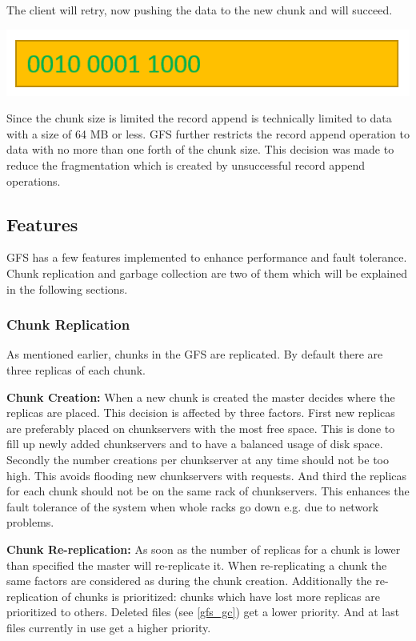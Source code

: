 \documentclass{sig-alternate}
\begin{document}
The client will retry, now pushing the data to the new chunk and will succeed.

\includegraphics[width=\linewidth]{gfs_pics/writeappend_3.png}

Since the chunk size is limited the record append is technically limited to data with a size of 64 MB or less. GFS further restricts the record append operation to data with no more than one forth of the chunk size. This decision was made to reduce the fragmentation which is created by unsuccessful record append operations.

\subsection{Features}
GFS has a few features implemented to enhance performance and fault tolerance. Chunk replication and garbage collection are two of them which will be explained in the following sections.

\subsubsection{Chunk Replication}
\label{gfs_fault_tolerance_load_balancing}
As mentioned earlier, chunks in the GFS are replicated. By default there are three replicas of each chunk.

\textbf{Chunk Creation:}
When a new chunk is created the master decides where the replicas are placed. This decision is affected by three factors. First new replicas are preferably placed on chunkservers with the most free space. This is done to fill up newly added chunkservers and to have a balanced usage of disk space. Secondly the number creations per chunkserver at any time should not be too high. This avoids flooding new chunkservers with requests. And third the replicas for each chunk should not be on the same rack of chunkservers. This enhances the fault tolerance of the system when whole racks go down e.g. due to network problems.

\textbf{Chunk Re-replication:}
As soon as the number of replicas for a chunk is lower than specified the master will re-replicate it. When re-replicating a chunk the same factors are considered as during the chunk creation. Additionally the re-replication of chunks is prioritized: chunks which have lost more replicas are prioritized to others. Deleted files (see \ref{gfs_gc}) get a lower priority. And at last files currently in use get a higher priority. 
\end{document}

